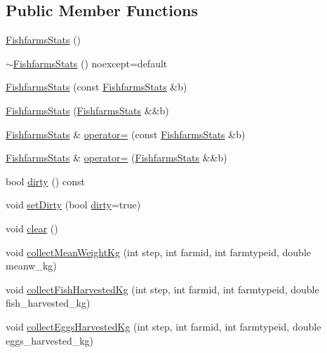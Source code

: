 \subsection*{Public Member Functions}
\begin{DoxyCompactItemize}
\item 
\mbox{\hyperlink{class_fishfarms_stats_a8df36900fc6e603b138bb62eb32583f9}{Fishfarms\+Stats}} ()
\item 
\mbox{\hyperlink{class_fishfarms_stats_a78b1d47662845876ddb77e9c379664e9}{$\sim$\+Fishfarms\+Stats}} () noexcept=default
\item 
\mbox{\hyperlink{class_fishfarms_stats_a30cb9faf5577c5299a7442e1fcab14be}{Fishfarms\+Stats}} (const \mbox{\hyperlink{class_fishfarms_stats}{Fishfarms\+Stats}} \&b)
\item 
\mbox{\hyperlink{class_fishfarms_stats_a4e020c532483d9eb337f378cce00c31d}{Fishfarms\+Stats}} (\mbox{\hyperlink{class_fishfarms_stats}{Fishfarms\+Stats}} \&\&b)
\item 
\mbox{\hyperlink{class_fishfarms_stats}{Fishfarms\+Stats}} \& \mbox{\hyperlink{class_fishfarms_stats_a0168ce425a597529e407fea9c8840da3}{operator=}} (const \mbox{\hyperlink{class_fishfarms_stats}{Fishfarms\+Stats}} \&b)
\item 
\mbox{\hyperlink{class_fishfarms_stats}{Fishfarms\+Stats}} \& \mbox{\hyperlink{class_fishfarms_stats_a37e85d7cc4811b05c046457733bc39c8}{operator=}} (\mbox{\hyperlink{class_fishfarms_stats}{Fishfarms\+Stats}} \&\&b)
\item 
bool \mbox{\hyperlink{class_fishfarms_stats_a81165f0ceac0a247b33c2a3beda67588}{dirty}} () const
\item 
void \mbox{\hyperlink{class_fishfarms_stats_aad91d298d9c2e527a77c8fb8e86cfbcc}{set\+Dirty}} (bool \mbox{\hyperlink{class_fishfarms_stats_a81165f0ceac0a247b33c2a3beda67588}{dirty}}=true)
\item 
void \mbox{\hyperlink{class_fishfarms_stats_a2d5a843e50cf3c3908eb52806f887706}{clear}} ()
\item 
void \mbox{\hyperlink{class_fishfarms_stats_ac5107f039390ec5212c06f09f2e286cc}{collect\+Mean\+Weight\+Kg}} (int step, int farmid, int farmtypeid, double meanw\+\_\+kg)
\item 
void \mbox{\hyperlink{class_fishfarms_stats_aa82750f6596838b63d9ef054cbf6c985}{collect\+Fish\+Harvested\+Kg}} (int step, int farmid, int farmtypeid, double fish\+\_\+harvested\+\_\+kg)
\item 
void \mbox{\hyperlink{class_fishfarms_stats_af2ee722bc230c1e802719fcd6f2d1210}{collect\+Eggs\+Harvested\+Kg}} (int step, int farmid, int farmtypeid, double eggs\+\_\+harvested\+\_\+kg)

\end{DoxyCompactItemize}
